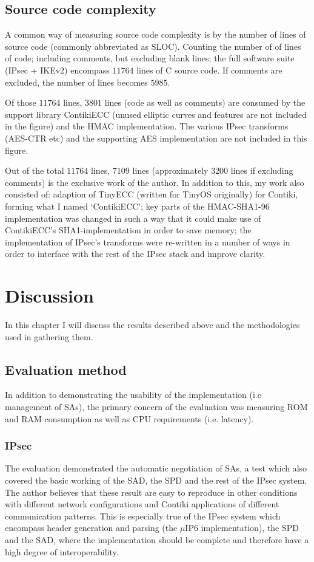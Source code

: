 \documentclass[final,a4paper,twoside,11pt,onecolumn]{report}
\begin{document}
\section{Source code complexity}
A common way of measuring source code complexity is by the number of lines of source code (commonly abbreviated as SLOC). Counting the number of of lines of code; including comments, but excluding blank lines; the full software suite (IPsec + IKEv2) encompass $11 764$ lines of C source code. If comments are excluded, the number of lines becomes $5 985$.

Of those $11 764$ lines, $3 801$ lines (code as well as comments) are consumed by the support library ContikiECC (unused elliptic curves and features are not included in the figure) and the HMAC implementation. The various IPsec transforms (AES-CTR etc) and the supporting AES implementation are not included in this figure.

Out of the total $11 764$ lines, $7 109$ lines (approximately $3 200$ lines if excluding comments) is the exclusive work of the author. In addition to this, my work also consisted of: adaption of TinyECC (written for TinyOS originally) for Contiki, forming what I named `ContikiECC'; key parts of the HMAC-SHA1-96 implementation was changed in such a way that it could make use of ContikiECC's SHA1-implementation in order to save memory; the implementation of IPsec's transforms were re-written in a number of ways in order to interface with the rest of the IPsec stack and improve clarity.




\chapter{Discussion}
In this chapter I will discuss the results described above and the methodologies used in gathering them.

\section{Evaluation method}
In addition to demonstrating the usability of the implementation (i.e management of SAs), the primary concern of the evaluation was measuring ROM and RAM consumption as well as CPU requirements (i.e. latency).

\subsection{IPsec}
The evaluation demonstrated the automatic negotiation of SAs, a test which also covered the basic working of the SAD, the SPD and the rest of the IPsec system. The author believes that these result are easy to reproduce in other conditions with different network configurations and Contiki applications of different communication patterns. This is especially true of the IPsec system which encompass header generation and parsing (the $\mu$IP6 implementation), the SPD and the SAD, where the implementation should be complete and therefore have a high degree of interoperability.
\end{document}
